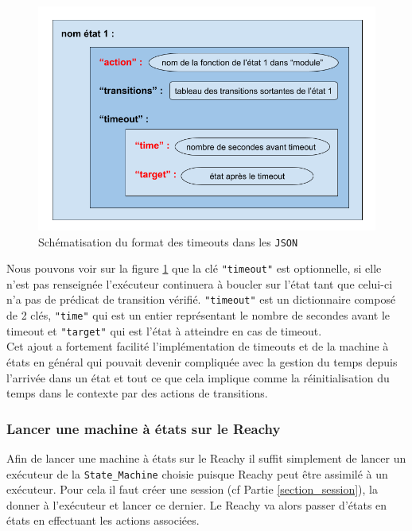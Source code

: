 \documentclass[a4paper,french]{article}
\begin{document}
\begin{figure}[H]
    \centering
    \includegraphics[scale=0.4]{figures/schema_timeout.png}
    \caption{Schématisation du format des timeouts dans les \texttt{JSON}}
    \label{fig:timeout}
\end{figure}

Nous pouvons voir sur la figure \ref{fig:timeout} que la clé \texttt{"timeout"} est optionnelle, si elle n'est pas renseignée l'exécuteur continuera à boucler sur l'état tant que celui-ci n'a pas de prédicat de transition vérifié. \texttt{"timeout"} est un dictionnaire composé de 2 clés, \texttt{"time"} qui est un entier représentant le nombre de secondes avant le timeout et \texttt{"target"} qui est l'état à atteindre en cas de timeout. \\

Cet ajout a fortement facilité l'implémentation de timeouts et de la machine à états en général qui pouvait devenir compliquée avec la gestion du temps depuis l'arrivée dans un état et tout ce que cela implique comme la réinitialisation du temps dans le contexte par des actions de transitions.

\subsubsection{Lancer une machine à états sur le Reachy}

Afin de lancer une machine à états sur le Reachy il suffit simplement de lancer un exécuteur de la \texttt{State\_Machine} choisie puisque Reachy peut être assimilé à un exécuteur. Pour cela il faut créer une session (cf Partie \ref{section_session}), la donner à l'exécuteur et lancer ce dernier. Le Reachy va alors passer d'états en états en effectuant les actions associées. \\
\end{document}
